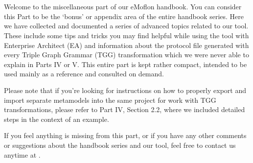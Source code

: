 \part{\partTitle}
\label{chap:misc}

\genHeader

Welcome to the miscellaneous part of our eMoflon handbook. You can consider this
Part to be the `bonus' or appendix area of the entire handbook series. Here we have collected and documented a series of advanced topics related to our tool. These include some tips and tricks you may find helpful while using the tool with
Enterprise Architect (EA) and information about the protocol file generated with every
Triple Graph Grammar (TGG) transformation which we were never able to explain in Parts IV or V. This entire part is kept rather compact, intended to be used
mainly as a reference and consulted on demand.

Please note that if you're looking for instructions on how to properly export and import separate metamodels into the same project for work with TGG
transformations, please refer to Part IV, Section 2.2, where we included detailed steps in the context of
an example.

If you feel anything is missing from this part, or if you have any other comments or suggestions about the handbook series and our tool, feel free to contact us
anytime at \eMoflonContact.

 














